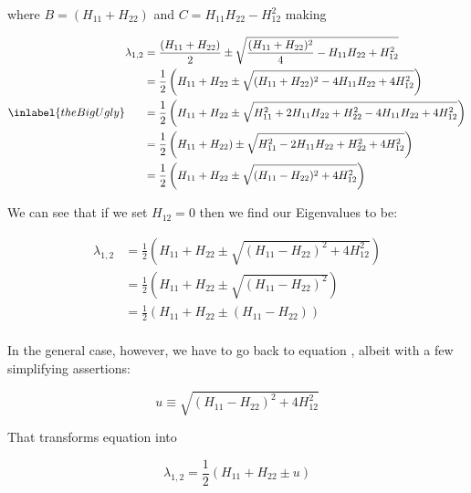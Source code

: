 \begin{answer}
  where $B = (H_{11} + H_{22})$ and $C = H_{11}H_{22} - H_{12}^2$
  making

  \begin{equation}
    \inlabel{theBigUgly}
    \begin{split}
      \lambda_{1,2} &= \frac{(H_{11} + H_{22})}{2} \pm
      \sqrt{\frac{(H_{11} + H_{22})^2}{4} - H_{11}H_{22} + H_{12}^2}\\
      &= \frac{1}{2}\left(H_{11} + H_{22} \pm
      \sqrt{(H_{11} + H_{22})^2 - 4H_{11}H_{22} + 4H_{12}^2}\right)\\
      &= \frac{1}{2}\left(H_{11} + H_{22}\pm
      \sqrt{H_{11}^2 + 2H_{11}H_{22} + H_{22}^2 - 4H_{11}H_{22} + 4H_{12}^2}\right)\\
      &= \frac{1}{2}\left(H_{11} + H_{22}) \pm
      \sqrt{H_{11}^2 - 2H_{11}H_{22} + H_{22}^2 + 4H_{12}^2}\right)\\
      &= \frac{1}{2}\left(H_{11} + H_{22} \pm
      \sqrt{(H_{11} - H_{22})^2 + 4H_{12}^2}\right)\\
    \end{split}
  \end{equation}

  We can see that if we set $H_{12} = 0$ then we find our Eigenvalues
  to be:

  \begin{equation}
    \begin{split}
      \lambda_{1,2}
      &= \frac{1}{2}\left(H_{11} + H_{22} \pm
      \sqrt{(H_{11} - H_{22})^2 + 4H_{12}^2}\right)\\
      &= \frac{1}{2}\left(H_{11} + H_{22} \pm \sqrt{(H_{11} - H_{22})^2}\right)\\
      &= \frac{1}{2}\left(H_{11} + H_{22} \pm (H_{11} - H_{22})\right)\\
    \end{split}
  \end{equation}

  In the general case, however, we have to go back to equation
  , albeit with a few simplifying assertions:

  \begin{equation}
    u \equiv \sqrt{(H_{11} - H_{22})^2 + 4H_{12}^2}
  \end{equation}

  That transforms equation  into

  \begin{equation}
    \lambda_{1,2} = \frac 1 2 (H_{11} + H_{22} \pm u)
  \end{equation}


\end{answer}
